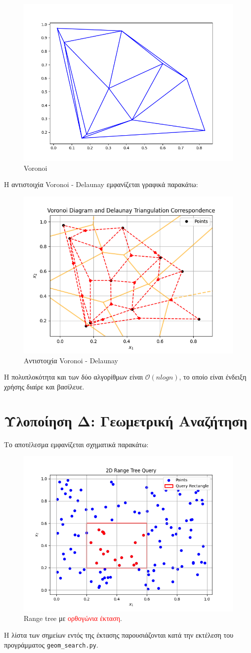 \documentclass[11pt, oneside]{article}   	%
\begin{document}
\begin{figure}[h!]
	\centering
	\includegraphics[width=0.7\linewidth]{Figure_3}
	\caption{Voronoi}
	\label{fig:figure3}
\end{figure}

Η αντιστοιχία Voronoi - Delaunay εμφανίζεται γραφικά παρακάτω:

\begin{figure}[h!]
	\centering
	\includegraphics[width=0.7\linewidth]{Figure_4}
	\caption{Αντιστοιχία Voronoi - Delaunay}
	\label{fig:figure4}
\end{figure}

Η πολυπλοκότητα και των δύο αλγορίθμων είναι $\mathcal{O}(nlogn)$, το οποίο είναι ένδειξη χρήσης διαίρε και βασίλευε.
\newpage

\section{Υλοποίηση Δ: Γεωμετρική Αναζήτηση}

Το αποτέλεσμα εμφανίζεται σχηματικά παρακάτω:

\begin{figure}[h!]
	\centering
	\includegraphics[width=0.7\linewidth]{Figure_5}
	\caption{Range tree με \textcolor{red}{ορθογώνια έκταση}.}
	\label{fig:figure5}
\end{figure}

Η λίστα των σημείων εντός της έκτασης παρουσιάζονται κατά την εκτέλεση του προγράμματος \verb|geom_search.py|.
\end{document}
